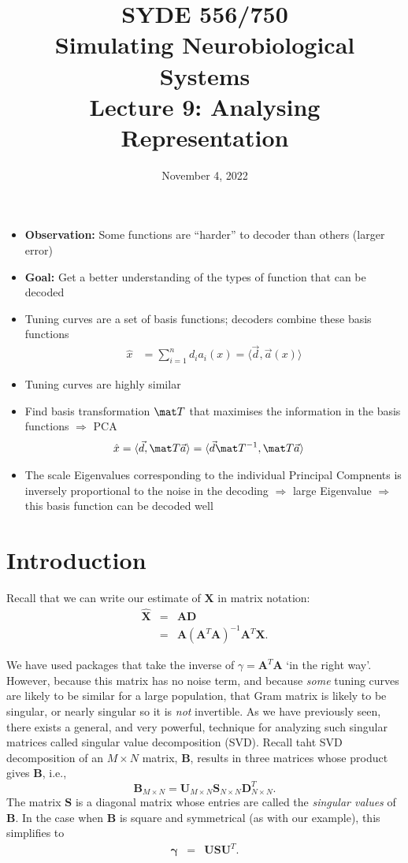 \documentclass[10pt,letterpaper,oneside]{article}
\date{November 4, 2022}
\title{SYDE 556/750 \\ Simulating Neurobiological Systems \\ Lecture 9: Analysing Representation}
\begin{document}



\begin{itemize}
	\item \textbf{Observation:} Some functions are \enquote{harder} to decoder than others (larger error)
	\item \textbf{Goal:} Get a better understanding of the types of function that can be decoded
	\item Tuning curves are a set of basis functions; decoders combine these basis functions
	\begin{align*}
		\hat x &= \sum_{i = 1}^n d_i a_i(x) = \langle \vec d, \vec a(x) \rangle
	\end{align*}
	\item Tuning curves are highly similar
	\item Find basis transformation $\mat T$ that maximises the information in the basis functions $\Rightarrow$ PCA
	\begin{align*}
		\hat x &= \langle \vec d, \mat T \vec a \rangle = \langle \vec d \mat T^{-1}, \mat T \vec a \rangle
	\end{align*}
	\item The scale Eigenvalues corresponding to the individual Principal Compnents is inversely proportional to the noise in the decoding $\Rightarrow$ large Eigenvalue $\Rightarrow$ this basis function can be decoded well
\end{itemize}

\section{Introduction}

Recall that we can write our estimate of $\mathbf{X}$ in matrix notation:
\begin{eqnarray*}
  \hat{\mathbf{X}} & = & \mathbf{A}\mathbf{D}\\
   & = & \mathbf{A}(\mathbf{A}^{T}\mathbf{A})^{-1}\mathbf{A}^{T}\mathbf{X}.
\end{eqnarray*}

We have used packages that take the inverse of $\gamma = \mathbf{A}^{T}\mathbf{A}$ `in the right way'. However, because this matrix has no noise term, and because \emph{some} tuning curves are likely to be similar for a large population, that Gram matrix is likely to be singular, or nearly singular
so it is \emph{not} invertible. As we have previously seen, there exists a general, and very powerful, technique for analyzing
such singular matrices called singular value decomposition (SVD).
Recall taht SVD decomposition of an $M\times N$ matrix, $\mathbf{B}$, results in three matrices whose product gives $\mathbf{B}$, i.e.,
\[
\mathbf{B}_{M\times N}=\mathbf{U}_{M\times N}\mathbf{S}_{N\times N}\mathbf{D}_{N\times N}^{T}.
\]
The matrix $\mathbf{S}$ is a diagonal matrix whose entries are called
the \emph{singular values} of $\mathbf{B}$. In the case when $\mathbf{B}$ is square and symmetrical (as with our example), this simplifies to
\begin{eqnarray*}
\boldsymbol{\gamma} & = & \mathbf{USU}^{T}.
\end{eqnarray*}
\end{document}
